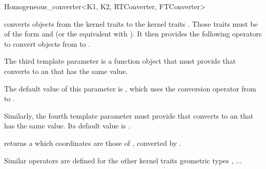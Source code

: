 \begin{ccRefClass}{Homogeneous_converter<K1, K2, RTConverter, FTConverter>}

\KernelRefLayout\gdef\ccTagOperatorLayout{\ccFalse}

\ccDefinition

\ccClassTemplateName converts objects from the kernel traits  to
the kernel traits .  Those traits must be of the form
 and  (or the equivalent with
).  It then provides the following operators to
convert objects from  to .

The third template parameter  is a function object that must
provide  that 
converts  to an  that has the same value.

The default value of this parameter is ,
which uses the conversion operator from
 to .

Similarly, the fourth template parameter must provide
 that
converts  to an  that has the same value.  Its
default value is  .


\ccCreation
{}


\ccOperations

{ returns a  which coordinates are those of ,
converted by .}

Similar operators are defined for the other kernel traits geometric types
, ...

\ccSeeAlso
{} \\
 \\

\end{ccRefClass}

